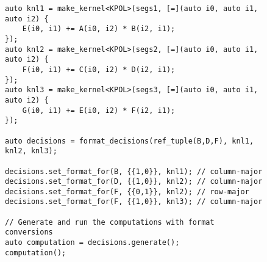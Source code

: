 





\begin{figure}
\begin{lstlisting}[caption={Changing data layouts for three Views in the \textsc{3mm} benchmark using \FormatDecisions.},
	label={FormatDecisions3MM}]
auto knl1 = make_kernel<KPOL>(segs1, [=](auto i0, auto i1, auto i2) {
	E(i0, i1) += A(i0, i2) * B(i2, i1);
});
auto knl2 = make_kernel<KPOL>(segs2, [=](auto i0, auto i1, auto i2) {
	F(i0, i1) += C(i0, i2) * D(i2, i1);
});
auto knl3 = make_kernel<KPOL>(segs3, [=](auto i0, auto i1, auto i2) {
	G(i0, i1) += E(i0, i2) * F(i2, i1);
});

auto decisions = format_decisions(ref_tuple(B,D,F), knl1, knl2, knl3);

decisions.set_format_for(B, {{1,0}}, knl1); // column-major
decisions.set_format_for(D, {{1,0}}, knl2); // column-major
decisions.set_format_for(F, {{0,1}}, knl2); // row-major
decisions.set_format_for(F, {{1,0}}, knl3); // column-major

// Generate and run the computations with format conversions
auto computation = decisions.generate();
computation();
\end{lstlisting}

\end{figure}

